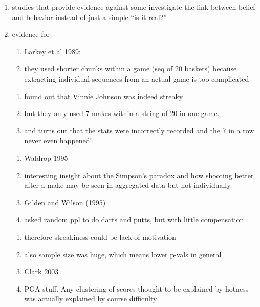 \documentclass[12pt,twoside]{dukestatscithesis}
\providecommand{\tightlist}{%
  \setlength{\itemsep}{0pt}\setlength{\parskip}{0pt}}
\theoremstyle{definition}
\theoremstyle{definition}
\theoremstyle{definition}
\theoremstyle{remark}
\begin{document}
\begin{enumerate}
\def\labelenumi{\arabic{enumi}.}
\tightlist
\item
  studies that provide evidence against some investigate the link
  between belief and behavior instead of just a simple ``is it real?''
\item
  evidence for
  \begin{enumerate}
  \def\labelenumii{\alph{enumii}.}
  \tightlist
  \item
    Larkey et al 1989:
  \item
    they used shorter chunks within a game (seq of 20 baskets) because
    extracting individual sequences from an actual game is too
    complicated
  \end{enumerate}
  \begin{enumerate}
  \def\labelenumii{\roman{enumii}.}
  \setcounter{enumii}{1}
  \tightlist
  \item
    found out that Vinnie Johnson was indeed streaky
  \item
    but they only used 7 makes within a string of 20 in one game.
  \item
    and turns out that the stats were incorrectly recorded and the 7 in
    a row never even happened!
  \end{enumerate}
  \begin{enumerate}
  \def\labelenumii{\alph{enumii}.}
  \setcounter{enumii}{1}
  \tightlist
  \item
    Waldrop 1995
  \item
    interesting insight about the Simpson's paradox and how shooting
    better after a make may be seen in aggregated data but not
    individually.
  \item
    Gilden and Wilson (1995)
  \item
    asked random ppl to do darts and putts, but with little compensation
  \end{enumerate}
  \begin{enumerate}
  \def\labelenumii{\roman{enumii}.}
  \setcounter{enumii}{1}
  \tightlist
  \item
    therefore streakiness could be lack of motivation
  \item
    also sample size was huge, which means lower p-vals in general
  \item
    Clark 2003
  \item
    PGA stuff. Any clustering of scores thought to be explained by
    hotness was actually explained by course difficulty
  \end{enumerate}

\end{enumerate}
\end{document}
